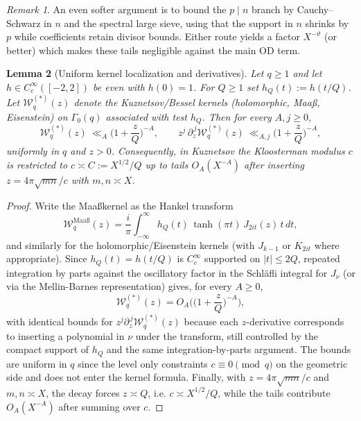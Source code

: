 \documentclass[11pt]{article}
\newtheorem{lemma}{Lemma}[section]
\theoremstyle{definition}
\theoremstyle{remark}
\newtheorem{remark}[lemma]{Remark}
\begin{document}
\begin{remark}
	An even softer argument is to bound the $p\mid n$ branch by Cauchy--Schwarz in $n$ and the spectral large sieve, using that the support in $n$ shrinks by $p$ while coefficients retain divisor bounds. Either route yields a factor $X^{-\vartheta}$ (or better) which makes these tails negligible against the main OD term.
\end{remark}


\begin{lemma}[Uniform kernel localization and derivatives]\label{lem:kernel-localization}
	Let $q\ge 1$ and let $h\in C_c^\infty([-2,2])$ be even with $h(0)=1$. For $Q\ge 1$ set $h_Q(t):=h(t/Q)$. Let $\mathcal W_q^{(*)}(z)$ denote the Kuznetsov/Bessel kernels (holomorphic, Maaß, Eisenstein) on $\Gamma_0(q)$ associated with test $h_Q$. Then for every $A,j\ge 0$,
	\[
		\mathcal W_q^{(*)}(z)\ \ll_A \Big(1+\frac{z}{Q}\Big)^{-A},\qquad
		z^j\,\partial_z^{\,j}\mathcal W_q^{(*)}(z)\ \ll_{A,j}\Big(1+\frac{z}{Q}\Big)^{-A},
	\]
	uniformly in $q$ and $z>0$. Consequently, in Kuznetsov the Kloosterman modulus $c$ is restricted to $c\asymp C:=X^{1/2}/Q$ up to tails $O_A(X^{-A})$ after inserting $z=4\pi\sqrt{mn}/c$ with $m,n\asymp X$.
\end{lemma}

\begin{proof}
	Write the Maa\ss kernel as the Hankel transform
	\[
		\mathcal W_q^{\mathrm{Maa\text{\ss}}}(z) = \frac{i}{\pi}\int_{-\infty}^{\infty} h_Q(t)\,\tanh(\pi t)\,J_{2it}(z)\,t\,dt,
	\]
	and similarly for the holomorphic/Eisenstein kernels (with $J_{k-1}$ or $K_{2it}$ where appropriate). Since $h_Q(t)=h(t/Q)$ is $C_c^\infty$ supported on $|t|\le 2Q$, repeated integration by parts against the oscillatory factor in the Schl\"afli integral for $J_\nu$ (or via the Mellin-Barnes representation) gives, for every $A\ge 0$,
	\[
		\mathcal W_q^{(*)}(z)=O_A\!\Big(\Big(1+\frac{z}{Q}\Big)^{-A}\Big),
	\]
	with identical bounds for $z^j\partial_z^{\,j}\mathcal W_q^{(*)}(z)$ because each $z$-derivative corresponds to inserting a polynomial in $\nu$ under the transform, still controlled by the compact support of $h_Q$ and the same integration-by-parts argument. The bounds are uniform in $q$ since the level only constraints $c\equiv 0\pmod q$ on the geometric side and does not enter the kernel formula.
	Finally, with $z=4\pi\sqrt{mn}/c$ and $m,n\asymp X$, the decay forces $z\asymp Q$, i.e. $c\asymp X^{1/2}/Q$, while the tails contribute $O_A(X^{-A})$ after summing over $c$.
\end{proof}
\end{document}
